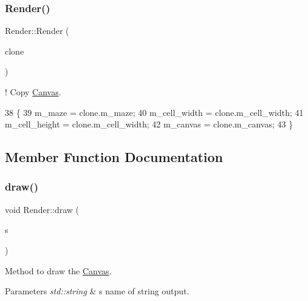 \subsubsection{\texorpdfstring{Render()}{Render()}\hspace{0.1cm}{\footnotesize\ttfamily [2/2]}}
{\footnotesize\ttfamily Render\+::\+Render (\begin{DoxyParamCaption}\item[{const \hyperlink{classRender}{Render} \&}]{clone }\end{DoxyParamCaption})\hspace{0.3cm}{\ttfamily [inline]}}



! Copy \hyperlink{classCanvas}{Canvas}. 


\begin{DoxyCode}
38         \{
39             m\_maze = clone.m\_maze;
40             m\_cell\_width = clone.m\_cell\_width;
41             m\_cell\_height = clone.m\_cell\_width;
42             m\_canvas = clone.m\_canvas;
43         \}
\end{DoxyCode}


\subsection{Member Function Documentation}
\mbox{\label{classRender_a67e9fdbd6725960fd59d6350e8cd17cc}} 
\subsubsection{\texorpdfstring{draw()}{draw()}}
{\footnotesize\ttfamily void Render\+::draw (\begin{DoxyParamCaption}\item[{std\+::string}]{s }\end{DoxyParamCaption})}



Method to draw the \hyperlink{classCanvas}{Canvas}. 


\begin{DoxyParams}{Parameters}
{\em std\+::string} & s name of string output. \\
\hline
\end{DoxyParams}


